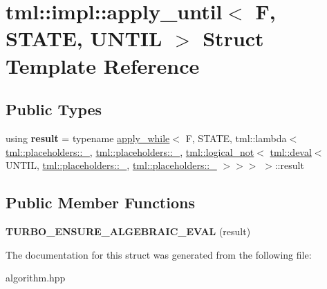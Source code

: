 \hypertarget{structtml_1_1impl_1_1apply__until}{\section{tml\+:\+:impl\+:\+:apply\+\_\+until$<$ F, S\+T\+A\+T\+E, U\+N\+T\+I\+L $>$ Struct Template Reference}
\label{structtml_1_1impl_1_1apply__until}
}
\subsection*{Public Types}
\begin{DoxyCompactItemize}
\item 
\hypertarget{structtml_1_1impl_1_1apply__until_a6cabeedd01f0cd839a570f43a297684f}{using {\bfseries result} = typename \hyperlink{structtml_1_1impl_1_1apply__while}{apply\+\_\+while}$<$ F, S\+T\+A\+T\+E, tml\+::lambda$<$ \hyperlink{structtml_1_1placeholder}{tml\+::placeholders\+::\+\_}, \hyperlink{structtml_1_1placeholder}{tml\+::placeholders\+::\+\_}, \hyperlink{structtml_1_1logical__not}{tml\+::logical\+\_\+not}$<$ \hyperlink{structtml_1_1delayed__eval}{tml\+::deval}$<$ U\+N\+T\+I\+L, \hyperlink{structtml_1_1placeholder}{tml\+::placeholders\+::\+\_}, \hyperlink{structtml_1_1placeholder}{tml\+::placeholders\+::\+\_} $>$$>$$>$ $>$\+::result}\label{structtml_1_1impl_1_1apply__until_a6cabeedd01f0cd839a570f43a297684f}

\end{DoxyCompactItemize}
\subsection*{Public Member Functions}
\begin{DoxyCompactItemize}
\item 
\hypertarget{structtml_1_1impl_1_1apply__until_a4d3f1d397c567049962f09e0c4aec9ec}{{\bfseries T\+U\+R\+B\+O\+\_\+\+E\+N\+S\+U\+R\+E\+\_\+\+A\+L\+G\+E\+B\+R\+A\+I\+C\+\_\+\+E\+V\+A\+L} (result)}\label{structtml_1_1impl_1_1apply__until_a4d3f1d397c567049962f09e0c4aec9ec}

\end{DoxyCompactItemize}


The documentation for this struct was generated from the following file\+:\begin{DoxyCompactItemize}
\item 
algorithm.\+hpp\end{DoxyCompactItemize}
